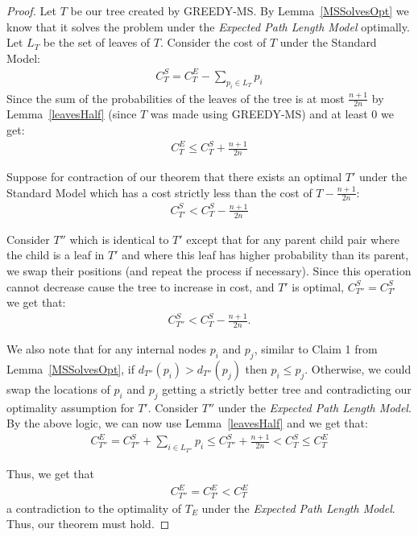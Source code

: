\documentclass[letterpaper,12pt,titlepage,oneside,final]{book}
\theoremstyle{plain}
\begin{document}
\begin{proof}
Let $T$ be our tree created by GREEDY-MS. By Lemma~\ref{MSSolvesOpt} we know that it solves the problem under the \textit{Expected Path Length Model} optimally. Let $L_T$ be the set of leaves of $T$. Consider the cost of $T$ under the Standard Model:
\begin{align*}
C^S_T = C^E_T - \sum_{p_i \in L_T} p_i
\end{align*}
Since the sum of the probabilities of the leaves of the tree is at most $\frac{n+1}{2n}$ by Lemma~\ref{leavesHalf} (since $T$ was made using GREEDY-MS) and at least $0$ we get:
\begin{align*}
C^E_T \leq C^S_T + \frac{n+1}{2n}
\end{align*}

Suppose for contraction of our theorem that there exists an optimal $T'$ under the Standard Model which has a cost strictly less than the cost of $T-\frac{n+1}{2n}$:
\begin{align*}
C^S_{T'} < C^S_T - \frac{n+1}{2n}
\end{align*}

Consider $T''$ which is identical to $T'$ except that for any parent child pair where the child is a leaf in $T'$ and where this leaf has higher probability than its parent, we swap their positions (and repeat the process if necessary). Since this operation cannot decrease cause the tree to increase in cost, and $T'$ is optimal, $C^S_{T''} = C^S_{T'}$ we get that:
\begin{align*}
C^S_{T''} < C^S_T - \frac{n+1}{2n}.
\end{align*} 

We also note that for any internal nodes $p_i$ and $p_j$, similar to Claim 1 from Lemma~\ref{MSSolvesOpt}, if $d_{T''}(p_i) > d_{T''}(p_j)$ then $p_i \leq p_j$. Otherwise, we could swap the locations of $p_i$ and $p_j$ getting a strictly better tree and contradicting our optimality assumption for $T'$. Consider $T''$ under the \textit{Expected Path Length Model}. By the above logic, we can now use Lemma~\ref{leavesHalf} and we get that:
\begin{align*}
C^E_{T''} = C^S_{T''} + \sum_{i \in L_{T''}}p_i \leq C^S_{T''} + \frac{n+1}{2n} < C^S_T \leq C^E_T
\end{align*}

\noindent Thus, we get that
\begin{align*}
C^E_{T''} = C^E_{T'} < C^E_T
\end{align*} 
a contradiction to the optimality of $T_E$ under the \textit{Expected Path Length Model}. Thus, our theorem must hold.

\end{proof}
\end{document}
